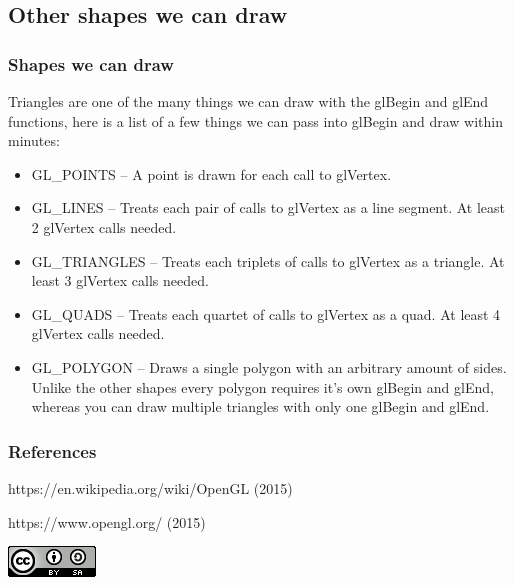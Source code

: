 \documentclass{beamer}
\begin{document}
          \subsection{Other shapes we can draw}
          \begin{frame}
            \frametitle{Shapes we can draw}
            Triangles are one of the many things we can draw with the glBegin and glEnd functions, here is a list of a few things we can pass into glBegin and draw within minutes:\\
            \begin{itemize}
            \item{GL\_POINTS} -- A point is drawn for each call to glVertex.
            \item{GL\_LINES} -- Treats each pair of calls to glVertex as a line segment. At least 2 glVertex calls needed.
            \item{GL\_TRIANGLES} -- Treats each triplets of calls to glVertex as a triangle. At least 3 glVertex calls needed.  \item{GL\_QUADS} -- Treats each quartet of calls to glVertex as a quad. At least 4 glVertex calls needed.
            \item{GL\_POLYGON} -- Draws a single polygon with an arbitrary amount of sides. Unlike the other shapes every polygon requires it's own glBegin and glEnd, whereas you can draw multiple triangles with only one glBegin and glEnd.
            \end{itemize}
          \end{frame}

          \begin{frame}
            \frametitle{References}
            \footnotesize{
              \begin{thebibliography}{99}
               https://en.wikipedia.org/wiki/OpenGL (2015)

               https://www.opengl.org/ (2015)
              \end{thebibliography}
            }
            \includegraphics[scale=.33]{cc.png}

          \end{frame}


          
\end{document}
